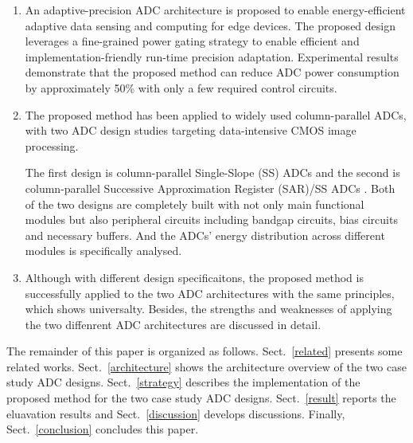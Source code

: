 \begin{enumerate}[\IEEEsetlabelwidth{3)}]
	\item 
	An adaptive-precision ADC architecture is proposed to enable energy-efficient adaptive data sensing and computing for edge devices. The proposed design leverages a fine-grained power gating strategy to enable efficient and implementation-friendly run-time precision adaptation.
	Experimental results demonstrate that the proposed method can reduce ADC power consumption by approximately 50\% with only a few required control circuits.
	\item 
	The proposed method has been applied to widely used column-parallel ADCs, with two ADC design studies targeting data-intensive CMOS image processing.
	
	The first design is column-parallel Single-Slope (SS) ADCs \cite{snoeij_18v_2005}\cite{kleinfelder_10000_2001} and the second is column-parallel Successive Approximation Register (SAR)/SS ADCs \cite{kim_area-efficient_2016}.
	Both of the two designs are completely built with not only main functional modules but also peripheral circuits including bandgap circuits, bias circuits and necessary buffers. And the ADCs' energy distribution across different modules is specifically analysed. 
	\item 
	Although with different design specificaitons, the proposed method is successfully applied to the two ADC architectures with the same principles, which shows universalty. Besides, the strengths and weaknesses of applying the two diffenrent ADC architectures are discussed in detail.
\end{enumerate} 

The remainder of this paper is organized as follows. 
Sect.~\ref{related} presents some related works.
Sect.~\ref{architecture} shows the architecture overview of the two case study ADC designs. 
Sect.~\ref{strategy} describes the implementation of the proposed method for the two case study ADC designs. 
Sect.~\ref{result} reports the eluavation results and Sect.~\ref{discussion} develops discussions. 
Finally, Sect.~\ref{conclusion} concludes this paper.